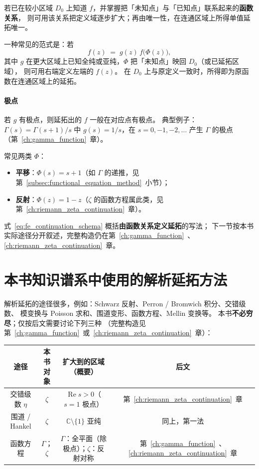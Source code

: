 若已在较小区域 $D_0$ 上知道 $f$，并掌握把「未知点」与「已知点」联系起来的\textbf{函数关系}，
则可用该关系把定义域逐步扩大；再由唯一性，在连通区域上所得单值延拓唯一。

一种常见的范式是：若
\begin{equation}
\label{eq:fe_continuation_schema}
  f(z) \;=\; g(z)\, f\bigl(\Phi(z)\bigr),
\end{equation}
其中 $g$ 在更大区域上已知全纯或亚纯，$\Phi$ 把「未知点」映回 $D_0$（或已延拓区域），
则可用右端定义左端的 $f(z)$。
在 $D_0$ 上与原定义一致时，所得即为原函数在连通区域上的延拓。

\paragraph{极点}
若 $g$ 有极点，则延拓出的 $f$ 一般在对应点有极点。
典型例子：$\Gamma(s)=\Gamma(s+1)/s$ 中 $g(s)=1/s$，在 $s=0,-1,-2,\ldots$ 产生 $\Gamma$ 的极点
（第~\ref{ch:gamma_function}~章）。

常见两类 $\Phi$：
\begin{itemize}
  \item \textbf{平移}：$\Phi(s)=s+1$（如 $\Gamma$ 的递推，见第~\ref{subsec:functional_equation_method}~小节）；
  \item \textbf{反射}：$\Phi(z)=1-z$（$\zeta$ 的函数方程属此类，见第~\ref{ch:riemann_zeta_continuation}~章）。
\end{itemize}

式~\eqref{eq:fe_continuation_schema} 概括\textbf{由函数关系定义延拓}的写法；
下一节按本书实际途径分开叙述，完整构造仍在第~\ref{ch:gamma_function}~、\ref{ch:riemann_zeta_continuation}~章。


\section{本书知识谱系中使用的解析延拓方法}\label{sec:common_methods}

解析延拓的途径很多，例如：Schwarz 反射、Perron / Bromwich 积分、交错级数、
模变换与 Poisson 求和、围道变形、函数方程、Mellin 变换等。
本书\textbf{不必穷尽}；仅按后文需要讨论下列三种
（完整构造见第~\ref{ch:gamma_function}~或~\ref{ch:riemann_zeta_continuation}~章）：

\begin{center}
\renewcommand{\arraystretch}{1.25}
\begin{tabular}{|c|c|c|c|}
\hline
\textbf{途径} & \textbf{本书对象} & \textbf{扩大到的区域（概要）} & \textbf{后文} \\
\hline
交错级数 $\eta$ & $\zeta$ & $\operatorname{Re}s>0$（$s=1$ 极点） & 第~\ref{ch:riemann_zeta_continuation}~章 \\
围道 / Hankel & $\zeta$ & $\mathbb{C}\setminus\{1\}$ 亚纯 & 同上，第一法 \\
函数方程 & $\Gamma$；$\zeta$ & $\Gamma$：全平面（除极点）；$\zeta$：反射对称 & 第~\ref{ch:gamma_function}~、\ref{ch:riemann_zeta_continuation}~章 \\
\hline
\end{tabular}
\end{center}

